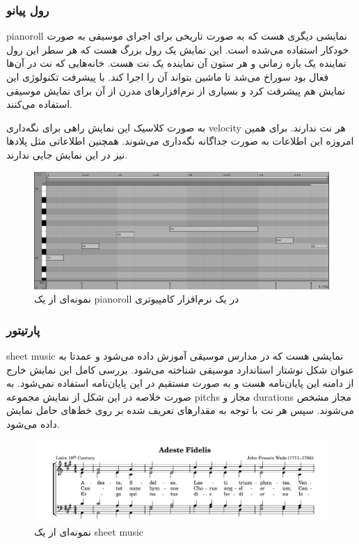\subsubsection{رول پیانو}
\gls{pianoroll} نمایشی دیگری هست که به صورت تاریخی برای اجرای موسیقی به صورت
خودکار استفاده می‌شده است. این نمایش یک رول بزرگ هست که هر سطر این رول نماینده
یک بازه زمانی و هر ستون آن نماینده یک نت هست. خانه‌هایی که نت در آن‌ها فعال بود
سوراخ می‌شد تا ماشین بتواند آن را اجرا کند. با پیشرفت تکنولوژی این نمایش هم
پیشرفت کرد و بسیاری از نرم‌افزارهای مدرن از آن برای نمایش موسیقی استفاده
می‌کنند.

به صورت کلاسیک این نمایش راهی برای نگه‌داری \gls{velocity} هر نت ندارند. برای
همین امروزه این اطلاعات به صورت جداگانه نگه‌داری می‌شوند. همچنین اطلاعاتی مثل
پلادها نیز در این نمایش جایی ندارند.
\begin{figure}
    \centering
    \includegraphics[width=12cm]{./statics/midi_piano_roll.png}
    \caption{نمونه‌ای از یک \gls{pianoroll} در یک نرم‌افزار کامپیوتری}
\end{figure}

\subsubsection{پارتیتور}
\gls{sheet music} نمایشی هست که در مدارس موسیقی آموزش داده می‌شود و عمدتا به
عنوان شکل نوشتار استاندارد موسیقی شناخته می‌شود. بررسی کامل این نمایش خارج از
دامنه‌ این پایان‌نامه هست و به صورت مستقیم در این پایان‌نامه استفاده نمی‌شود. به
صورت خلاصه در این شکل از نمایش مجموعه \glspl{pitch}‌ مجاز و \glspl{duration}‌
مجاز مشخص می‌شوند. سپس هر نت با توجه به مقدارهای تعریف شده بر روی خط‌های حامل
نمایش داده می‌شود.
\begin{figure}
    \centering
    \includegraphics[width=12cm]{./statics/sheet_music.png}
    \caption{نمونه‌ای از یک \gls{sheet music}}
\end{figure}

